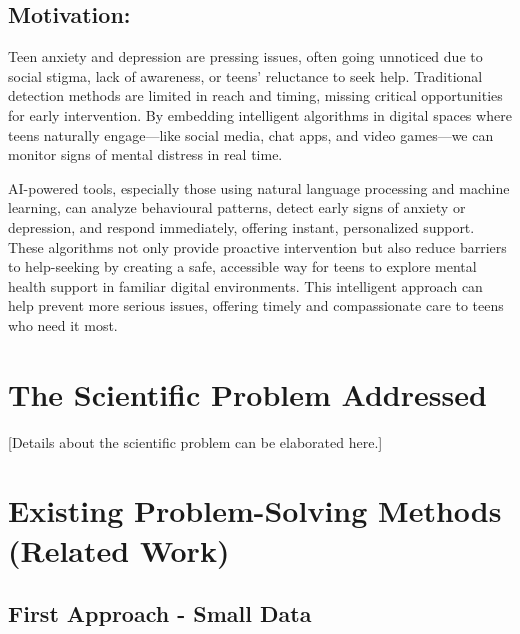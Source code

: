 \documentclass[a4paper,12pt]{article}
\begin{document}
\vspace{0.5cm} %

\subsection{Motivation:}
Teen anxiety and depression are pressing issues, often going unnoticed due to social stigma, lack of awareness, or teens' reluctance to seek help. Traditional detection methods are limited in reach and timing, missing critical opportunities for early intervention. By embedding intelligent algorithms in digital spaces where teens naturally engage—like social media, chat apps, and video games—we can monitor signs of mental distress in real time.

AI-powered tools, especially those using natural language processing and machine learning, can analyze behavioural patterns, detect early signs of anxiety or depression, and respond immediately, offering instant, personalized support. These algorithms not only provide proactive intervention but also reduce barriers to help-seeking by creating a safe, accessible way for teens to explore mental health support in familiar digital environments. This intelligent approach can help prevent more serious issues, offering timely and compassionate care to teens who need it most.

\vspace{1cm} %

\section{The Scientific Problem Addressed}

[Details about the scientific problem can be elaborated here.]

\vspace{1cm} %

\section{Existing Problem-Solving Methods (Related Work)}

\subsection{First Approach - Small Data}
\end{document}
